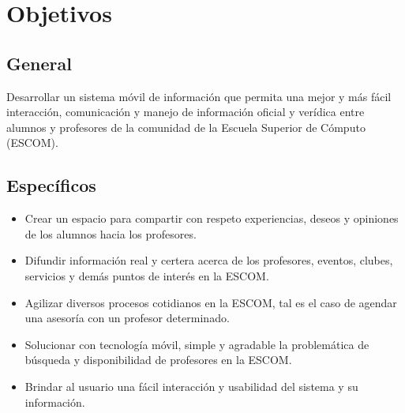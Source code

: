 \section{Objetivos}

\subsection{General}

\noindent
Desarrollar un sistema móvil de información que permita una mejor y más fácil interacción, comunicación y manejo de información oficial y verídica entre alumnos y profesores de la comunidad de la Escuela Superior de Cómputo (ESCOM). \newline

\subsection{Específicos}
	\begin{itemize}
		\item Crear un espacio para compartir con respeto experiencias, deseos y opiniones de los alumnos hacia los profesores.%
		\item Difundir información real y certera acerca de los profesores, eventos, clubes, servicios y demás puntos de interés en la ESCOM. 
		\item Agilizar diversos procesos cotidianos en la ESCOM, tal es el caso de agendar una asesoría con un profesor determinado. 
		\item Solucionar con tecnología móvil, simple y agradable la problemática de búsqueda y disponibilidad de profesores en la ESCOM. 
		\item Brindar al usuario una fácil interacción y usabilidad del sistema y su información. 
	\end{itemize}